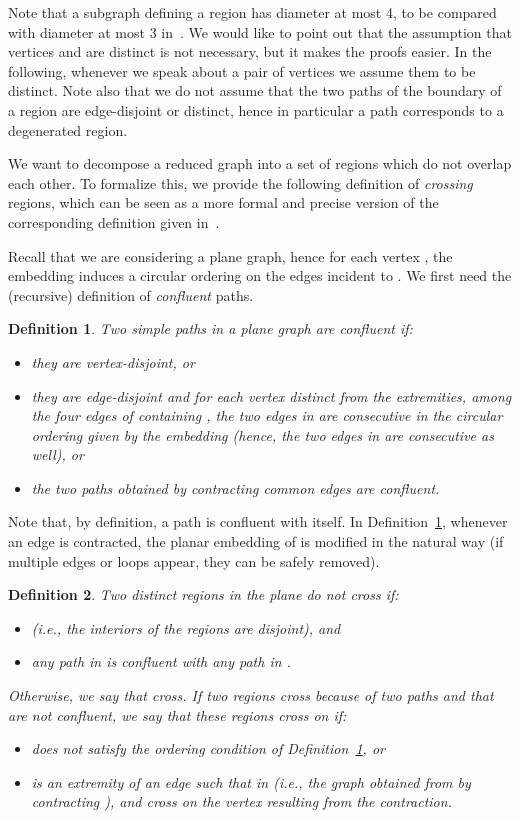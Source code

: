 \documentclass[a4paper,11pt]{article}
\newtheorem{defi} {Definition}
\begin{document}
Note that a subgraph defining a region has diameter at most 4, to be compared with diameter at most 3 in~\cite{AFN04}. We would like to point out that the assumption that vertices  and  are distinct is not necessary, but it makes the proofs easier. In the following, whenever we speak about a pair of vertices we assume them to be  distinct. Note also that we do not assume that the two paths of the boundary of a region are edge-disjoint or distinct, hence in particular a path corresponds to a degenerated region.

We want to decompose a reduced graph into a set of regions which do not overlap each other. To formalize this, we provide the following definition of \emph{crossing} regions, which can be seen as a more formal and precise version of the corresponding definition given in~\cite{AFN04}.

Recall that we are considering a plane graph, hence for each vertex , the embedding induces a circular ordering on the edges incident to . We first need the (recursive) definition of \emph{confluent} paths.


\begin{defi}\label{def:confluent} Two simple paths  in a plane graph  are \emph{confluent} if:
\begin{itemize}\itemsep0em
\item they are vertex-disjoint, or
\item they are edge-disjoint and for each vertex  distinct from the  extremities, among the four edges of  containing , the two edges in  are consecutive in the circular ordering given by the embedding (hence, the two edges in  are consecutive as well), or
\item the two paths obtained by contracting common edges are confluent.
\end{itemize}\end{defi}

Note that, by definition, a path is confluent with itself. In Definition~\ref{def:confluent}, whenever an edge is contracted, the planar embedding of  is modified in the natural way (if multiple edges or loops appear, they can be safely removed).

\begin{defi}\label{def:cross} Two distinct regions  in the plane \emph{do not cross} if:
\begin{itemize}\itemsep0em
\item   (i.e., the interiors of the regions are disjoint), and
\item any path  in  is confluent with any path  in .
\end{itemize}
\noindent Otherwise, we say that  \emph{cross}. If two regions cross because of two paths  and  that are not confluent, we say that these regions \emph{cross on } if:
\begin{itemize}\itemsep0em
\item  does not satisfy the ordering condition of Definition~\ref{def:confluent}, or
\item  is an extremity of an edge  such that in  (i.e., the graph obtained from  by contracting ),  and  cross on the vertex resulting from the contraction.
\end{itemize} \end{defi}
\end{document}
